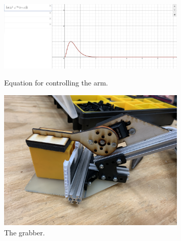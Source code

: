 \begin{figure}[ht]
\centering
\begin{minipage}[b]{.50\textwidth}
  \centering
  \includegraphics[width=0.8\textwidth]{Meetings/October/10-12-21/10-12-21_Team_Figure3 - Nathan Forrer.PNG}
  \caption{Equation for controlling the arm.}
  \label{fig:pic3}
\end{minipage}%
\hfill%
\begin{minipage}[b]{.50\textwidth}
  \centering
  \includegraphics[width=0.8\textwidth]{Meetings/October/10-12-21/10-12-21_Team_Figure4 - Nathan Forrer.JPG}
  \caption{The grabber.}
  \label{fig:pic4}
\end{minipage}
\end{figure}